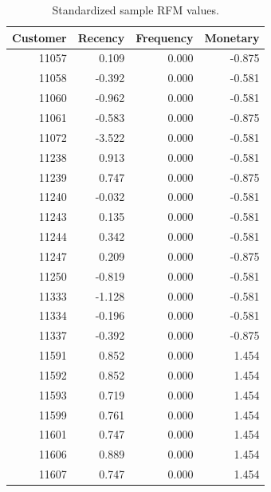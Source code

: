 \begin{table}[htbp]
  \centering
  \small
  \begin{tabular}{rrrr}
    \hline
    \textbf{Customer} & \textbf{Recency} & \textbf{Frequency} & \textbf{Monetary} \\
    \hline
    11057             & 0.109            & 0.000              & -0.875            \\
    11058             & -0.392           & 0.000              & -0.581            \\
    11060             & -0.962           & 0.000              & -0.581            \\
    11061             & -0.583           & 0.000              & -0.875            \\
    11072             & -3.522           & 0.000              & -0.581            \\
    11238             & 0.913            & 0.000              & -0.581            \\
    11239             & 0.747            & 0.000              & -0.875            \\
    11240             & -0.032           & 0.000              & -0.581            \\
    11243             & 0.135            & 0.000              & -0.581            \\
    11244             & 0.342            & 0.000              & -0.581            \\
    11247             & 0.209            & 0.000              & -0.875            \\
    11250             & -0.819           & 0.000              & -0.581            \\
    11333             & -1.128           & 0.000              & -0.581            \\
    11334             & -0.196           & 0.000              & -0.581            \\
    11337             & -0.392           & 0.000              & -0.875            \\
    11591             & 0.852            & 0.000              & 1.454             \\
    11592             & 0.852            & 0.000              & 1.454             \\
    11593             & 0.719            & 0.000              & 1.454             \\
    11599             & 0.761            & 0.000              & 1.454             \\
    11601             & 0.747            & 0.000              & 1.454             \\
    11606             & 0.889            & 0.000              & 1.454             \\
    11607             & 0.747            & 0.000              & 1.454             \\
    \hline
  \end{tabular}
  \caption{Standardized sample RFM values.}
\end{table}

